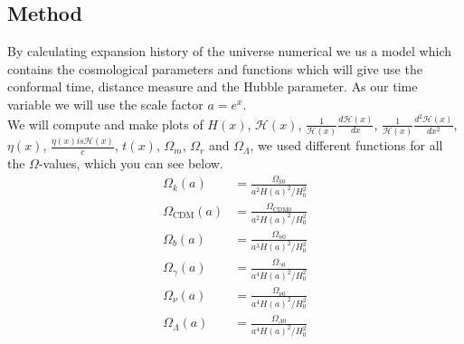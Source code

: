 \documentclass{article}
\begin{document}
\begin{multicols}{2}
\section{Method}
By calculating expansion history of the universe numerical we us a model which contains the cosmological parameters and functions which will give use the conformal time, distance measure and the Hubble parameter. As our time variable we will use the scale factor $a=e^{x}$.   
\\
We will compute and make plots of $H(x)$, $\mathcal{H}(x)$, $\frac{1}{\mathcal{H}(x)}\frac{d\mathcal{H}(x)}{dx}$, $\frac{1}{\mathcal{H}(x)}\frac{d^2\mathcal{H}(x)}{dx^2}$, $\eta(x)$, $\frac{\eta(x) is \mathcal{H}(x)}{c}$, $t(x)$, $\Omega_m$, $\Omega_r$ and $\Omega_\Lambda$, we used different functions for all the $\Omega$-values, which you can see below. 
\begin{align}
    \Omega_{k}(a)&=\frac{\Omega_{k0}}{a^2H(a)^2/H_0^2} \label{eq:Omega_k}\\
    \Omega_{\text{CDM}}(a)&=\frac{\Omega_{\text{CDM}0}}{a^2H(a)^2/H_0^2} \label{eq:Omega_CDM}\\
    \Omega_{b}(a)&=\frac{\Omega_{n0}}{a^3H(a)^2/H_0^2} \label{eq:Omega_b}\\
    \Omega_{\gamma}(a)&=\frac{\Omega_{\gamma0}}{a^4H(a)^2/H_0^2} \label{eq:Omega_gamma}\\
    \Omega_{\nu}(a)&=\frac{\Omega_{\nu0}}{a^4H(a)^2/H_0^2} \label{eq:Omega_nu}\\
    \Omega_{\Lambda}(a)&=\frac{\Omega_{\Lambda0}}{a^4H(a)^2/H_0^2} \label{eq:Omega_lambda}
\end{align}

\end{multicols}
\end{document}
